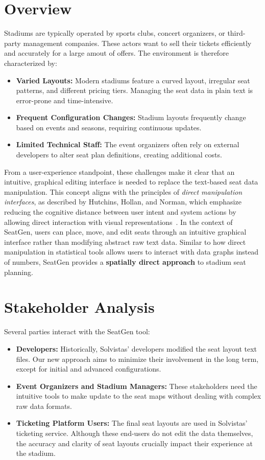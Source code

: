 \section{Overview}
Stadiums are typically operated by sports clubs, concert organizers, or third-party management companies. These actors want to sell their tickets efficiently and accurately for a large amout of offers. The environment is therefore characterized by:
\begin{itemize}
    \item \textbf{Varied Layouts:} Modern stadiums feature a curved layout, irregular seat patterns, and different pricing tiers. Managing the seat data in plain text is error-prone and time-intensive.
    \item \textbf{Frequent Configuration Changes:} Stadium layouts frequently change based on events and seasons, requiring continuous updates.
    \item \textbf{Limited Technical Staff:} The event organizers often rely on external developers to alter seat plan definitions, creating additional costs.
\end{itemize}

From a user-experience standpoint, these challenges make it clear that an intuitive, graphical editing interface is needed to replace the text-based seat data manipulation. This concept aligns with the principles of \emph{direct manipulation interfaces}, as described by Hutchins, Hollan, and Norman, which emphasize reducing the cognitive distance between user intent and system actions by allowing direct interaction with visual representations~\cite{Hutchins01121985}. In the context of SeatGen, users can place, move, and edit seats through an intuitive graphical interface rather than modifying abstract raw text data. Similar to how direct manipulation in statistical tools allows users to interact with data graphs instead of numbers, SeatGen provides a \textbf{spatially direct approach} to stadium seat planning.

\section{Stakeholder Analysis}
Several parties interact with the SeatGen tool:
\begin{itemize}
    \item \textbf{Developers:} Historically, Solvistas' developers modified the seat layout text files. Our new approach aims to minimize their involvement in the long term, except for initial and advanced configurations.
    \item \textbf{Event Organizers and Stadium Managers:} These stakeholders need the intuitive tools to make update to the seat maps without dealing with complex raw data formats.
    \item \textbf{Ticketing Platform Users:} The final seat layouts are used in Solvistas' ticketing service. Although these end-users do not edit the data themselves, the accuracy and clarity of seat layouts crucially impact their experience at the stadium.
\end{itemize}

